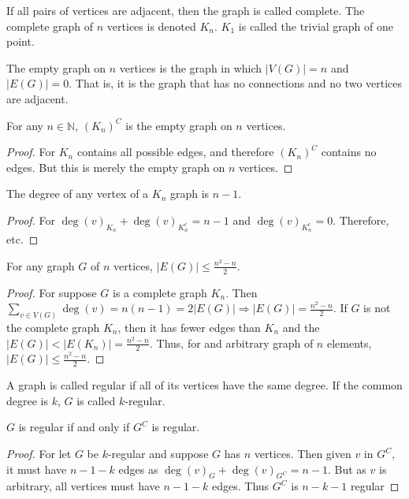 \documentclass[crop=false,class=book]{standalone}
\begin{document}
\begin{definition}
If all pairs of vertices are adjacent, then the graph is called complete. The complete graph of $n$ vertices is denoted $K_n$. $K_1$ is called the trivial graph of one point.
\end{definition}
\begin{definition}
The empty graph on $n$ vertices is the graph in which $|V(G)| = n$ and $|E(G)| = 0$. That is, it is the graph that has no connections and no two vertices are adjacent.
\end{definition}
\begin{corollary}
For any $n\in \mathbb{N}$, $(K_n)^C$ is the empty graph on $n$ vertices.
\end{corollary}
\begin{proof}
For $K_n$ contains all possible edges, and therefore $(K_n)^C$ contains no edges. But this is merely the empty graph on $n$ vertices.
\end{proof}
\begin{corollary}
The degree of any vertex of a $K_n$ graph is $n-1$.
\end{corollary}
\begin{proof}
For $\deg(v)_{K_n} + \deg(v)_{K_n^c}=n-1$ and $\deg(v)_{K_n^c} = 0$. Therefore, etc.
\end{proof}
\begin{corollary}
For any graph $G$ of $n$ vertices, $|E(G)|\leq \frac{n^2-n}{2}$.
\end{corollary}
\begin{proof}
For suppose $G$ is a complete graph $K_n$. Then $\sum_{v\in V(G)}\deg(v) = n(n-1) = 2|E(G)| \Rightarrow |E(G)| = \frac{n^2-n}{2}$. If $G$ is not the complete graph $K_n$, then it has fewer edges than $K_n$ and the $|E(G)| <|E(K_n)|= \frac{n^2-n}{2}$. Thus, for and arbitrary graph of $n$ elements, $|E(G)|\leq \frac{n^2-n}{2}$.
\end{proof}
\begin{definition}
A graph is called regular if all of its vertices have the same degree. If the common degree is $k$, $G$ is called $k$-regular.
\end{definition}
\begin{corollary}
$G$ is regular if and only if $G^C$ is regular. 
\end{corollary}
\begin{proof}
For let $G$ be $k$-regular and suppose $G$ has $n$ vertices. Then given $v$ in $G^C$, it must have $n-1-k$ edges as $\deg(v)_G + \deg(v)_{G^C} = n-1$. But as $v$ is arbitrary, all vertices must have $n-1-k$ edges. Thus $G^C$ is $n-k-1$ regular
\end{proof}
\end{document}
